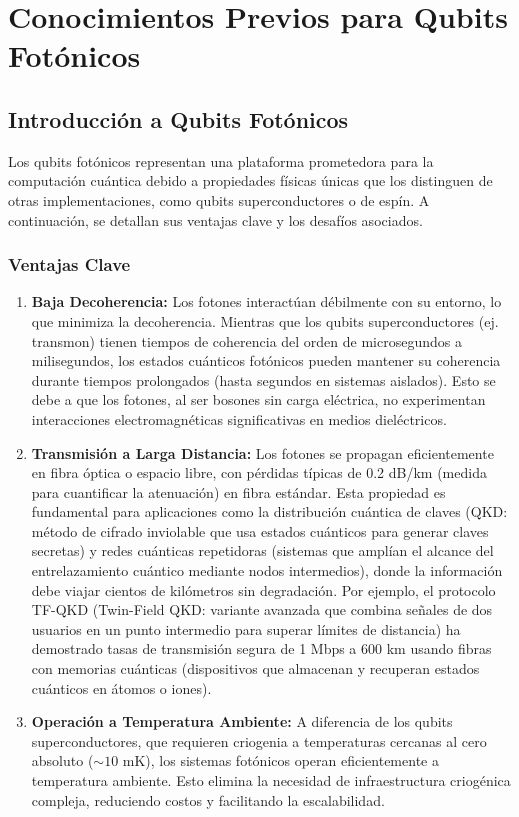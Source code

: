\documentclass{article}
\begin{document}
\section*{Conocimientos Previos para Qubits Fotónicos}

\subsection*{Introducción a Qubits Fotónicos}

Los qubits fotónicos representan una plataforma prometedora para la computación cuántica debido a propiedades físicas únicas que los distinguen de otras implementaciones, como qubits superconductores o de espín. A continuación, se detallan sus ventajas clave y los desafíos asociados.

\subsubsection*{Ventajas Clave}

\begin{enumerate}
    \item \textbf{Baja Decoherencia:}  
    Los fotones interactúan débilmente con su entorno, lo que minimiza la decoherencia. Mientras que los qubits superconductores (ej. transmon) tienen tiempos de coherencia del orden de microsegundos a milisegundos, los estados cuánticos fotónicos pueden mantener su coherencia durante tiempos prolongados (hasta segundos en sistemas aislados). Esto se debe a que los fotones, al ser bosones sin carga eléctrica, no experimentan interacciones electromagnéticas significativas en medios dieléctricos.

    \item \textbf{Transmisión a Larga Distancia:}  
    Los fotones se propagan eficientemente en fibra óptica o espacio libre, con pérdidas típicas de 0.2 dB/km (medida para cuantificar la atenuación) en fibra estándar. Esta propiedad es fundamental para aplicaciones como la distribución cuántica de claves (QKD: método de cifrado inviolable que usa estados cuánticos para generar claves secretas) y redes cuánticas repetidoras (sistemas que amplían el alcance del entrelazamiento cuántico mediante nodos intermedios), donde la información debe viajar cientos de kilómetros sin degradación. Por ejemplo, el protocolo TF-QKD (Twin-Field QKD: variante avanzada que combina señales de dos usuarios en un punto intermedio para superar límites de distancia) ha demostrado tasas de transmisión segura de 1 Mbps a 600 km usando fibras con memorias cuánticas (dispositivos que almacenan y recuperan estados cuánticos en átomos o iones).

    \item \textbf{Operación a Temperatura Ambiente:}  
    A diferencia de los qubits superconductores, que requieren criogenia a temperaturas cercanas al cero absoluto ($\sim 10$ mK), los sistemas fotónicos operan eficientemente a temperatura ambiente. Esto elimina la necesidad de infraestructura criogénica compleja, reduciendo costos y facilitando la escalabilidad.
\end{enumerate}
\end{document}
